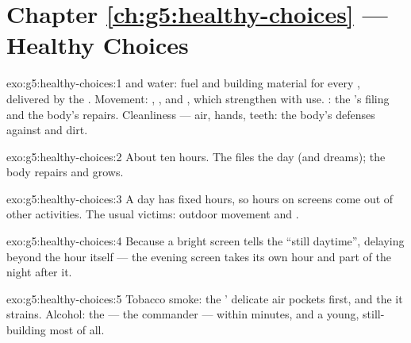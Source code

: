 \section*{Chapter \ref{ch:g5:healthy-choices} --- Healthy Choices}

\begin{solution}{exo:g5:healthy-choices:1}
 and water: fuel and building material for every
, delivered by the . Movement: , , 
and , which strengthen with use. : the 's
filing and the body's repairs. Cleanliness --- air, hands,
teeth: the body's defenses against  and dirt.
\end{solution}

\begin{solution}{exo:g5:healthy-choices:2}
About ten hours. The  files the day (and dreams); the
body repairs and grows.
\end{solution}

\begin{solution}{exo:g5:healthy-choices:3}
A day has fixed hours, so hours on screens come out of other
activities. The usual victims: outdoor movement and .
\end{solution}

\begin{solution}{exo:g5:healthy-choices:4}
Because a bright screen tells the  ``still daytime'',
delaying  beyond the hour itself --- the evening screen
takes its own hour and part of the night after it.
\end{solution}

\begin{solution}{exo:g5:healthy-choices:5}
Tobacco smoke: the ' delicate air pockets first, and
the  it strains. Alcohol: the  --- the commander
--- within minutes, and a young, still-building  most
of all.
\end{solution}

